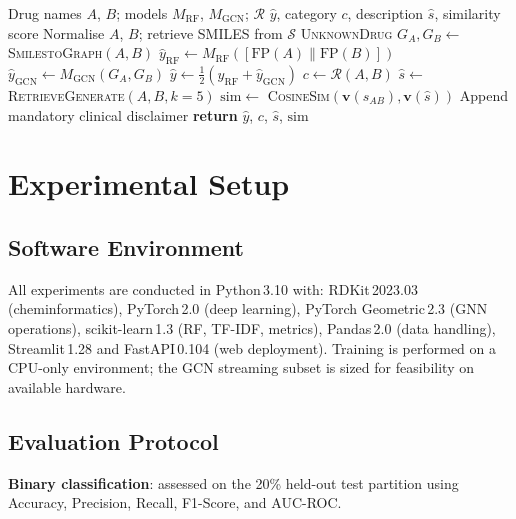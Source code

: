 \documentclass[conference]{IEEEtran}
\begin{document}
\begin{algorithm}[t]
\caption{Real-Time DDI Inference}
\label{alg:infer}
\begin{algorithmic}[1]
\Require Drug names $A$, $B$; models $M_{\mathrm{RF}}$, $M_{\mathrm{GCN}}$; $\mathcal{R}$
\Ensure $\hat{y}$, category $c$, description $\hat{s}$, similarity score
\State Normalise $A$, $B$; retrieve SMILES from $\mathcal{S}$
 \Return \textsc{UnknownDrug} \EndIf
\State $G_A,G_B \gets$ \textsc{SmilestoGraph}$(A,B)$
\State $\hat{y}_{\mathrm{RF}} \gets M_{\mathrm{RF}}([\mathrm{FP}(A)\|\mathrm{FP}(B)])$
\State $\hat{y}_{\mathrm{GCN}} \gets M_{\mathrm{GCN}}(G_A, G_B)$
\State $\hat{y} \gets \frac{1}{2}(\hat{y}_{\mathrm{RF}} + \hat{y}_{\mathrm{GCN}})$
\State $c \gets \mathcal{R}(A, B)$
\State $\hat{s} \gets$ \textsc{RetrieveGenerate}$(A, B, k{=}5)$
\State $\mathrm{sim} \gets$ \textsc{CosineSim}$(\mathbf{v}(s_{AB}), \mathbf{v}(\hat{s}))$ \hfill{}
\State Append mandatory clinical disclaimer
\State \textbf{return} $\hat{y}$, $c$, $\hat{s}$, $\mathrm{sim}$
\end{algorithmic}
\end{algorithm}

\section{Experimental Setup}
\label{sec:exp}

\subsection{Software Environment}

All experiments are conducted in Python\,3.10 with: RDKit\,2023.03 (cheminformatics),
PyTorch\,2.0 (deep learning), PyTorch Geometric\,2.3 (GNN operations),
scikit-learn\,1.3 (RF, TF-IDF, metrics), Pandas\,2.0 (data handling), Streamlit\,1.28
and FastAPI\,0.104 (web deployment). Training is performed on a CPU-only environment;
the GCN streaming subset is sized for feasibility on available hardware.

\subsection{Evaluation Protocol}

\textbf{Binary classification}: assessed on the 20\% held-out test partition using
Accuracy, Precision, Recall, F1-Score, and AUC-ROC.
\end{document}
